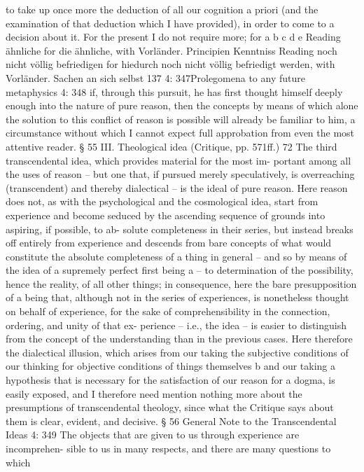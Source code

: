 to take up once more the deduction of all our cognition a priori (and
the examination of that deduction which I have provided), in order to
come to a decision about it. For the present I do not require more; for
a
b
c
d
e
Reading ähnliche for die ähnliche, with Vorländer.
Principien
Kenntniss
Reading noch nicht völlig befriedigen for hiedurch noch nicht völlig befriedigt werden, with
Vorländer.
Sachen an sich selbst
137
4: 347Prolegomena to any future metaphysics
4: 348
if, through this pursuit, he has ﬁrst thought himself deeply enough into
the nature of pure reason, then the concepts by means of which alone
the solution to this conﬂict of reason is possible will already be familiar
to him, a circumstance without which I cannot expect full approbation
from even the most attentive reader.
§ 55
III. Theological idea (Critique, pp. 571ff.) 72
The third transcendental idea, which provides material for the most im-
portant among all the uses of reason – but one that, if pursued merely
speculatively, is overreaching (transcendent) and thereby dialectical – is
the ideal of pure reason. Here reason does not, as with the psychological
and the cosmological idea, start from experience and become seduced
by the ascending sequence of grounds into aspiring, if possible, to ab-
solute completeness in their series, but instead breaks off entirely from
experience and descends from bare concepts of what would constitute
the absolute completeness of a thing in general – and so by means of
the idea of a supremely perfect ﬁrst being a – to determination of the
possibility, hence the reality, of all other things; in consequence, here
the bare presupposition of a being that, although not in the series of
experiences, is nonetheless thought on behalf of experience, for the sake
of comprehensibility in the connection, ordering, and unity of that ex-
perience – i.e., the idea – is easier to distinguish from the concept of the
understanding than in the previous cases. Here therefore the dialectical
illusion, which arises from our taking the subjective conditions of our
thinking for objective conditions of things themselves b and our taking a
hypothesis that is necessary for the satisfaction of our reason for a dogma,
is easily exposed, and I therefore need mention nothing more about the
presumptions of transcendental theology, since what the Critique says
about them is clear, evident, and decisive.
§ 56
General Note
to
the Transcendental Ideas
4: 349
The objects that are given to us through experience are incomprehen-
sible to us in many respects, and there are many questions to which
